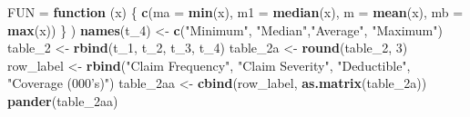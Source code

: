 \documentclass[]{book}
\newenvironment{Shaded}{\begin{snugshade}}{\end{snugshade}}
\newcommand{\KeywordTok}[1]{\textcolor[rgb]{0.13,0.29,0.53}{\textbf{#1}}}
\newcommand{\DataTypeTok}[1]{\textcolor[rgb]{0.13,0.29,0.53}{#1}}
\newcommand{\DecValTok}[1]{\textcolor[rgb]{0.00,0.00,0.81}{#1}}
\newcommand{\StringTok}[1]{\textcolor[rgb]{0.31,0.60,0.02}{#1}}
\newcommand{\ControlFlowTok}[1]{\textcolor[rgb]{0.13,0.29,0.53}{\textbf{#1}}}
\newcommand{\NormalTok}[1]{#1}
\theoremstyle{definition}
\theoremstyle{definition}
\theoremstyle{definition}
\theoremstyle{remark}
\begin{document}
\begin{Shaded}
\begin{Highlighting}[]
          \DataTypeTok{FUN =} \ControlFlowTok{function}\NormalTok{ (x) \{ }\KeywordTok{c}\NormalTok{(}\DataTypeTok{ma =} \KeywordTok{min}\NormalTok{(x), }\DataTypeTok{m1 =} \KeywordTok{median}\NormalTok{(x), }\DataTypeTok{m =} \KeywordTok{mean}\NormalTok{(x), }\DataTypeTok{mb =} \KeywordTok{max}\NormalTok{(x)) \} )}
\KeywordTok{names}\NormalTok{(t_}\DecValTok{4}\NormalTok{) <-}\StringTok{ }\KeywordTok{c}\NormalTok{(}\StringTok{"Minimum"}\NormalTok{, }\StringTok{"Median"}\NormalTok{,}\StringTok{"Average"}\NormalTok{, }\StringTok{"Maximum"}\NormalTok{)}
\NormalTok{table_}\DecValTok{2}\NormalTok{ <-}\StringTok{ }\KeywordTok{rbind}\NormalTok{(t_}\DecValTok{1}\NormalTok{, t_}\DecValTok{2}\NormalTok{, t_}\DecValTok{3}\NormalTok{, t_}\DecValTok{4}\NormalTok{)}
\NormalTok{table_2a <-}\StringTok{ }\KeywordTok{round}\NormalTok{(table_}\DecValTok{2}\NormalTok{, }\DecValTok{3}\NormalTok{)}
\NormalTok{row_label <-}\StringTok{ }\KeywordTok{rbind}\NormalTok{(}\StringTok{"Claim Frequency"}\NormalTok{, }\StringTok{"Claim Severity"}\NormalTok{, }\StringTok{"Deductible"}\NormalTok{, }\StringTok{"Coverage (000's)"}\NormalTok{)}
\NormalTok{table_2aa <-}\StringTok{ }\KeywordTok{cbind}\NormalTok{(row_label, }\KeywordTok{as.matrix}\NormalTok{(table_2a))}
\KeywordTok{pander}\NormalTok{(table_2aa)}
\end{Highlighting}
\end{Shaded}
\end{document}
